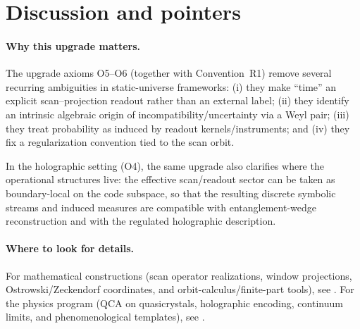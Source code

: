 \section{Discussion and pointers}
\paragraph{Why this upgrade matters.}
The upgrade axioms O5--O6 (together with Convention~R1) remove several recurring ambiguities in static-universe frameworks: (i) they make ``time'' an explicit scan--projection readout rather than an external label; (ii) they identify an intrinsic algebraic origin of incompatibility/uncertainty via a Weyl pair; (iii) they treat probability as induced by readout kernels/instruments; and (iv) they fix a regularization convention tied to the scan orbit.
\par
In the holographic setting (O4), the same upgrade also clarifies where the operational structures live: the effective scan/readout sector can be taken as boundary-local on the code subspace, so that the resulting discrete symbolic streams and induced measures are compatible with entanglement-wedge reconstruction and with the regulated holographic description.

\paragraph{Where to look for details.}
For mathematical constructions (scan operator realizations, window projections, Ostrowski/Zeckendorf coordinates, and orbit-calculus/finite-part tools), see \cite{Ma2025HPA}. For the physics program (QCA on quasicrystals, holographic encoding, continuum limits, and phenomenological templates), see \cite{Ma2025FoP}.
